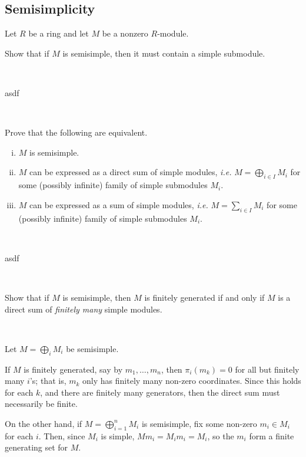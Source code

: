 \subsection{Semisimplicity}
\setcounter{subsection}{1}

\begin{exr}[title=Lemma 2.3] %
	Let $R$ be a ring and let $M$ be a nonzero $R$-module.

	Show that if $M$ is semisimple, then it must contain a simple submodule.
\end{exr} \

\begin{pf}
	asdf
\end{pf} \

\begin{exr}[title=Theorem 2.4] %
	Prove that the following are equivalent. \vspace{-0.2in}
	\begin{enumerate}[i)]
		\item $M$ is semisimple.
		\item $M$ can be expressed as a direct sum of simple modules,
			\textit{i.e.} $M=\bigoplus_{i\in I} M_i$ for some (possibly infinite)
			family of simple submodules $M_i$.
		\item $M$ can be expressed as a sum of simple modules,
			\textit{i.e.} $M=\sum_{i\in I} M_i$ for some (possibly infinite)
			family of simple submodules $M_i$.
	\end{enumerate}
\end{exr} \

\begin{pf}
	asdf
\end{pf} \

\begin{exr}
	Show that if $M$ is semisimple, then $M$ is finitely generated if and only if
	$M$ is a direct sum of \textit{finitely many} simple modules.
\end{exr} \

\begin{pf}
	Let $M=\bigoplus_{i}M_{i}$ be semisimple.

	If $M$ is finitely generated, say by $m_{1},\dots,m_{n}$,
	then $\pi_{i}(m_{k})=0$ for all but finitely many $i$'s; that is,
	$m_{k}$ only has finitely many non-zero coordinates.
	Since this holds for each $k$, and there are finitely many generators,
	then the direct sum must necessarily be finite.

	On the other hand, if $M=\bigoplus_{i=1}^{n}M_{i}$ is semisimple,
	fix some non-zero $m_{i}\in M_{i}$ for each $i$.
	Then, since $M_{i}$ is simple, $Mm_{i}=M_{i}m_{i}=M_{i}$, so
	the $m_{i}$ form a finite generating set for $M$.
\end{pf}


